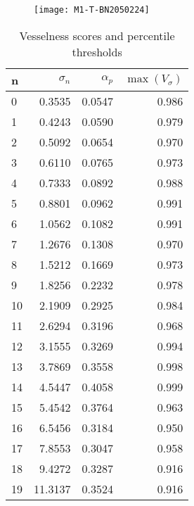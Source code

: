 
\begin{figure}[p]
    \centering
  \texttt{[image: M1-T-BN2050224]}
\end{figure}
\quad
\begin{table}[p]
    \begin{small}
  \begin{tabular}{l|r|r|r}
    n  & $\sigma_n$  &  $\alpha_p$  &  $\max(V_\sigma)$ \\
    \hline
    0  &   0.3535 &  0.0547 &  0.986\\
    1  &   0.4243 &  0.0590 &  0.979\\
    2  &   0.5092 &  0.0654 &  0.970\\
    3  &   0.6110 &  0.0765 &  0.973\\
    4  &   0.7333 &  0.0892 &  0.988\\
    5  &   0.8801 &  0.0962 &  0.991\\
    6  &   1.0562 &  0.1082 &  0.991\\
    7  &   1.2676 &  0.1308 &  0.970\\
    8  &   1.5212 &  0.1669 &  0.973\\
    9  &   1.8256 &  0.2232 &  0.978\\
    10 &   2.1909 &  0.2925 &  0.984\\
    11 &   2.6294 &  0.3196 &  0.968\\
    12 &   3.1555 &  0.3269 &  0.994\\
    13 &   3.7869 &  0.3558 &  0.998\\
    14 &   4.5447 &  0.4058 &  0.999\\
    15 &   5.4542 &  0.3764 &  0.963\\
    16 &   6.5456 &  0.3184 &  0.950\\
    17 &   7.8553 &  0.3047 &  0.958\\
    18 &   9.4272 &  0.3287 &  0.916\\
    19 &  11.3137 &  0.3524 &  0.916\\
    \end{tabular}
\end{small}
  \caption{Vesselness scores and percentile thresholds}
\end{table}
\clearpage


